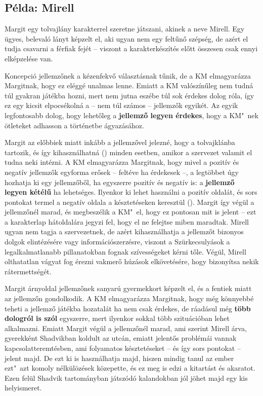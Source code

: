 \subsection[Mirell]{Példa: Mirell}

Margit egy tolvajlány karakterrel szeretne játszani, akinek a neve Mirell. Egy ügyes, belevaló lányt képzelt el, aki ugyan nem egy feltűnő szépség, de azért el tudja csavarni a férfiak fejét -- viszont a karakterkészítés előtt összesen csak ennyi elképzelése van.

Koncepció jellemzőnek a  kézenfekvő választásnak tűnik, de a KM elmagyarázza Margitnak, hogy ez eléggé unalmas lenne. Emiatt a KM valószínűleg nem tudná túl gyakran játékba hozni, mert nem jutna eszébe túl sok érdekes dolog róla, így ez egy kicsit elpocsékolná a -- nem túl számos -- jellemzők egyikét. Az egyik legfontosabb dolog, hogy lehetőleg a \textbf{jellemző legyen érdekes}, hogy a KM"~nek ötleteket adhasson a történetbe ágyazásához.

Margit az előbbiek miatt inkább a  jellemzővel jelezné, hogy a tolvajklánba tartozik, és így kihasználhatná () minden esetben, amikor a szervezet valamit el tudna neki intézni. A KM elmagyarázza Margitnak, hogy mivel a pozitív és negatív jellemzők egyforma erősek -- feltéve ha érdekesek --, a legtöbbet úgy hozhatja ki egy jellemzőből, ha egyszerre pozitív és negatív is: a \textbf{jellemző legyen kétélű} ha lehetséges. Ilyenkor ki lehet használni a pozitív oldalát, és sors pontokat termel a negatív oldala a késztetéseken keresztül (). Margit így végül a  jellemzőnél marad, és megbeszélik a KM"~el, hogy ez pontosan mit is jelent -- ezt a karakterlap hátoldalára jegyzi fel, hogy el ne felejtse miben maradtak. Mirell ugyan nem tagja a szervezetnek, de azért kihasználhatja a jellemzőt bizonyos dolgok elintézésére vagy információszerzésre, viszont a Szürkecsulyások a legalkalmatlanabb pillanatokban fognak szívességeket kérni tőle. Végül, Mirell olthatatlan vágyat fog érezni vakmerő húzások elkövetésére, hogy bizonyítsa nekik rátermettségét.

Margit árnyoldal jellemzőnek sanyarú gyermekkort képzelt el, és a fentiek miatt az  jellemzőn gondolkodik. A KM elmagyarázza Margitnak, hogy még könnyebbé teheti a jellemző játékba hozatalát ha nem csak érdekes, de ráadásul még \textbf{több dologról is szól} egyszerre, mert ilyenkor sokkal több szituációban lehet alkalmazni. Emiatt Margit végül a  jellemzőnél marad, ami szerint Mirell árva, gyerekként Shadvikban koldult az utcán, emiatt jelentős problémái vannak kapcsolatteremtésben, ami folyamatos késztetéseket -- és így sors pontokat -- jelent majd. De ezt ki is használhatja majd, hiszen mindig tanul az ember ezt"~azt komoly nélkülözések közepette, és ez meg is edzi a kitartást és akaratot. Ezen felül Shadvik tartományban játszódó kalandokban jól jöhet majd egy kis helyismeret.

